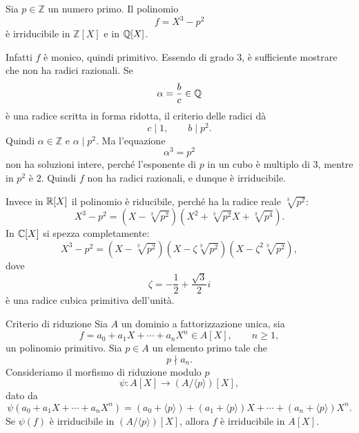 \documentclass[a4paper]{article}
\begin{document}
\begin{snippetexample}{}
    Sia \(p\in\mathbb{Z}\) un numero primo. Il polinomio
    \[
        f=X^3-p^2
    \]
    è irriducibile in \(\mathbb{Z}[X]\) e in \(\mathbb{Q}[X]\).

    Infatti \(f\) è monico, quindi primitivo. Essendo di grado \(3\), è sufficiente mostrare che non ha radici razionali.
    Se
    \[
        \alpha=\frac{b}{c}\in\mathbb{Q}
    \]
    è una radice scritta in forma ridotta, il criterio delle radici dà
    \[
        c\mid 1,
        \qquad
        b\mid p^2.
    \]
    Quindi \(\alpha\in\mathbb{Z}\) e \(\alpha\mid p^2\).
    Ma l'equazione
    \[
        \alpha^3=p^2
    \]
    non ha soluzioni intere, perché l'esponente di \(p\) in un cubo è multiplo di \(3\), mentre in \(p^2\) è \(2\).
    Quindi \(f\) non ha radici razionali, e dunque è irriducibile.

    Invece in \(\mathbb{R}[X]\) il polinomio è riducibile, perché ha la radice reale \(\sqrt[3]{p^2}\):
    \[
        X^3-p^2
        =
        \left(X-\sqrt[3]{p^2}\right)
        \left(X^2+\sqrt[3]{p^2}X+\sqrt[3]{p^4}\right).
    \]
    In \(\mathbb{C}[X]\) si spezza completamente:
    \[
        X^3-p^2
        =
        \left(X-\sqrt[3]{p^2}\right)
        \left(X-\zeta\sqrt[3]{p^2}\right)
        \left(X-\zeta^2\sqrt[3]{p^2}\right),
    \]
    dove
    \[
        \zeta=-\frac{1}{2}+\frac{\sqrt{3}}{2}i
    \]
    è una radice cubica primitiva dell'unità.
\end{snippetexample}

\begin{snippetproposition}{Criterio di riduzione}
    Sia \(A\) un dominio a fattorizzazione unica, sia
    \[
        f=a_0+a_1X+\cdots+a_nX^n\in A[X],
        \qquad
        n\geq 1,
    \]
    un polinomio primitivo.
    Sia \(p\in A\) un elemento primo tale che
    \[
        p\nmid a_n.
    \]
    Consideriamo il morfismo di riduzione modulo \(p\)
    \[
        \psi\colon A[X]\to (A/\langle p \rangle)[X],
    \]
    dato da
    \[
        \psi(a_0+a_1X+\cdots+a_nX^n)
        =
        (a_0+\langle p \rangle)+(a_1+\langle p \rangle)X+\cdots+(a_n+\langle p \rangle)X^n.
    \]
    Se \(\psi(f)\) è irriducibile in \((A/\langle p \rangle)[X]\), allora \(f\) è irriducibile in \(A[X]\).
\end{snippetproposition}
\end{document}
